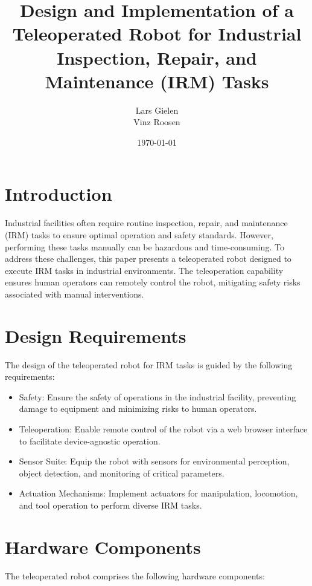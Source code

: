 \documentclass{article}
\title{Design and Implementation of a Teleoperated Robot for Industrial Inspection, Repair, and Maintenance (IRM) Tasks}
\author{Lars Gielen \\ Vinz Roosen}
\date{\today}
\begin{document}
\maketitle

\section{Introduction}

Industrial facilities often require routine inspection, repair, and maintenance (IRM) tasks to ensure optimal operation and safety standards. However, performing these tasks manually can be hazardous and time-consuming. To address these challenges, this paper presents a teleoperated robot designed to execute IRM tasks in industrial environments. The teleoperation capability ensures human operators can remotely control the robot, mitigating safety risks associated with manual interventions.

\section{Design Requirements}
The design of the teleoperated robot for IRM tasks is guided by the following requirements:

\begin{itemize}
    \item Safety: Ensure the safety of operations in the industrial facility, preventing damage to equipment and minimizing risks to human operators.
    \item Teleoperation: Enable remote control of the robot via a web browser interface to facilitate device-agnostic operation.
    \item Sensor Suite: Equip the robot with sensors for environmental perception, object detection, and monitoring of critical parameters.
    \item Actuation Mechanisms: Implement actuators for manipulation, locomotion, and tool operation to perform diverse IRM tasks.
\end{itemize}

\newpage
\section{Hardware Components}

The teleoperated robot comprises the following hardware components:
\end{document}
